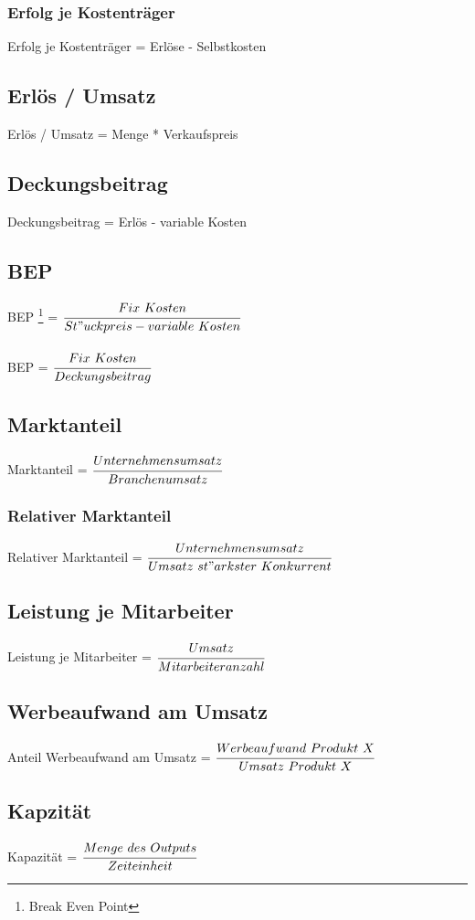 \documentclass[a4paper,12pt]{scrartcl}
\begin{document}
\subsubsection{Erfolg je Kostenträger}
Erfolg je Kostenträger = Erlöse - Selbstkosten 
\subsection{Erlös / Umsatz}
Erlös / Umsatz = Menge * Verkaufspreis
\subsection{Deckungsbeitrag}
Deckungsbeitrag = Erlös - variable Kosten
\subsection{BEP} 
BEP \footnote{Break Even Point} = $\cfrac{Fix~Kosten}{St"uckpreis - variable~ Kosten}$ 
\\
\\
BEP  = $\cfrac{Fix~Kosten}{Deckungsbeitrag}$ 


\subsection{Marktanteil}
Marktanteil = $\cfrac{Unternehmensumsatz}{Branchenumsatz}$
\subsubsection{Relativer Marktanteil}
Relativer Marktanteil = $\cfrac{Unternehmensumsatz}{Umsatz~st"arkster~Konkurrent}$

\subsection{Leistung je Mitarbeiter}
Leistung je Mitarbeiter = $\cfrac{Umsatz}{Mitarbeiteranzahl}$
\subsection{Werbeaufwand am Umsatz}
Anteil Werbeaufwand am Umsatz = $\cfrac{Werbeaufwand~Produkt~X}{Umsatz~Produkt~X}$



\subsection{Kapzität}
Kapazität = $\cfrac{Menge~des~Outputs}{Zeiteinheit}$
\end{document}

